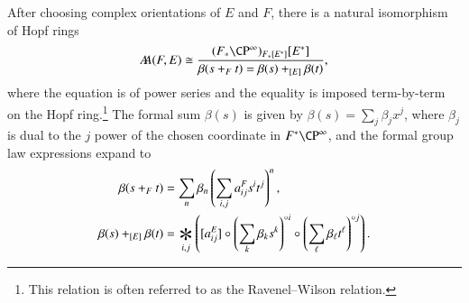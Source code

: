 \begin{lemma}\label{UnstableRWRelation}
After choosing complex orientations of $E$ and $F$, there is a natural isomorphism of Hopf rings \[\AA(F, E) \cong \frac{(F_* \CP^\infty)_{F_*[E^*]}[E^*]}{\beta(s +_F t) = \beta(s) +_{[E]} \beta(t)},\] where the equation is of power series and the equality is imposed term-by-term on the Hopf ring.\footnote{This relation is often referred to as the Ravenel--Wilson relation.}  The formal sum $\beta(s)$ is given by $\beta(s) = \sum_j \beta_j x^j$, where $\beta_j$ is dual to the $j${\th} power of the chosen coordinate in $F^* \CP^\infty$, and the formal group law expressions expand to
\begin{align*}
\beta(s +_F t) & = \sum_n \beta_n \left(\sum_{i, j} a_{ij}^F s^i t^j \right)^n, \\
\beta(s) +_{[E]} \beta(t) & = \bigast_{i, j} \left([a_{ij}^E] \circ \left( \sum_k \beta_k s^k \right)^{\circ i} \circ \left( \sum_\ell \beta_\ell t^\ell \right)^{\circ j} \right).
\end{align*}
\end{lemma}
